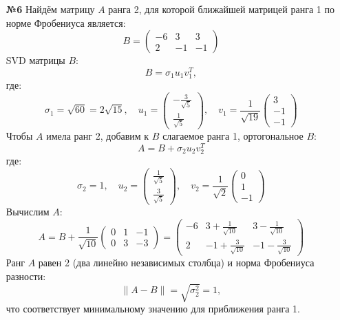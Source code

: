 \documentclass[a4paper]{article}
\begin{document}
\begin{enumerate}
  \item[\textbf{№6}]Найдём матрицу \( A \) ранга 2, для которой ближайшей матрицей ранга 1 по норме Фробениуса является:  
  \[
  B = \begin{pmatrix} -6 & 3 & 3 \\ 2 & -1 & -1 \end{pmatrix}
  \]
  SVD матрицы \( B \):
  \[
  B = \sigma_1 u_1 v_1^T,
  \]  
  где:
  \[\sigma_1 = \sqrt{60} = 2\sqrt{15}, \quad
  u_1 = \begin{pmatrix} -\frac{3}{\sqrt{5}} \\ \frac{1}{\sqrt{5}} \end{pmatrix} ,
  \quad v_1 = \frac{1}{\sqrt{19}} \begin{pmatrix} 3 \\ -1 \\ -1 \end{pmatrix}\] 
  Чтобы \( A \) имела ранг 2, добавим к \( B \) слагаемое ранга 1, ортогональное \( B \):  
  \[
  A = B + \sigma_2 u_2 v_2^T
  \]  
  где:
  \[\sigma_2 = 1, \quad
   u_2 = \begin{pmatrix} \frac{1}{\sqrt{5}} \\ \frac{3}{\sqrt{5}} \end{pmatrix},
   \quad  v_2 = \frac{1}{\sqrt{2}} \begin{pmatrix} 0 \\ 1 \\ -1 \end{pmatrix}\]
  Вычислим \( A \):
  \[
  A = B + \frac{1}{\sqrt{10}} \begin{pmatrix} 0 & 1 & -1 \\ 0 & 3 & -3 \end{pmatrix} = \begin{pmatrix}
  -6 & 3 + \frac{1}{\sqrt{10}} & 3 - \frac{1}{\sqrt{10}} \\
  2 & -1 + \frac{3}{\sqrt{10}} & -1 - \frac{3}{\sqrt{10}}
  \end{pmatrix}
  \]
  Ранг \( A \) равен 2 (два линейно независимых столбца) и норма Фробениуса разности:  
  \[
  \|A - B\| = \sqrt{\sigma_2^2} = 1,
  \]  
  что соответствует минимальному значению для приближения ранга 1.
\end{enumerate}
\end{document}
